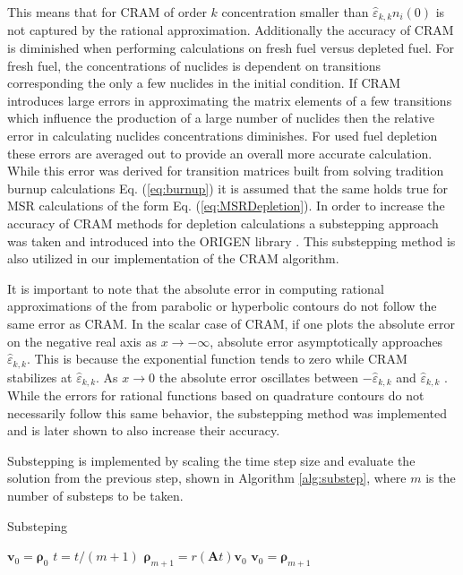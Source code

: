 \noindent This means that for CRAM of order $k$ concentration smaller than $\hat{\varepsilon}_{k,k}n_{i}(0)$ is not captured by the rational approximation. Additionally the accuracy of CRAM is diminished when performing calculations on fresh fuel versus depleted fuel. For fresh fuel, the concentrations of nuclides is dependent on transitions corresponding the only a few nuclides in the initial condition. If CRAM introduces large errors in approximating the matrix elements of a few transitions which influence the production of a large number of nuclides then the relative error in calculating nuclides concentrations diminishes. For used fuel depletion these errors are averaged out to provide an overall more accurate calculation. While this error was derived for transition matrices built from solving tradition burnup calculations Eq. (\ref{eq:burnup}) it is assumed that the same holds true for MSR calculations of the form Eq. (\ref{eq:MSRDepletion}). In order to increase the accuracy of CRAM methods for depletion calculations a substepping approach was taken and introduced into the ORIGEN library \cite{isotalo2016}. This substepping method is also utilized in our implementation of the CRAM algorithm. 

It is important to note that the absolute error in computing rational approximations of the from parabolic or hyperbolic contours do not follow the same error as CRAM. In the scalar case of CRAM, if one plots the absolute error on the negative real axis as $x \rightarrow -\infty$, absolute error asymptotically approaches $\hat{\varepsilon}_{k,k}$. This is because the exponential function tends to zero while CRAM stabilizes at $\hat{\varepsilon}_{k,k}$. As $x \rightarrow 0$ the absolute error oscillates between $-\hat{\varepsilon}_{k,k}$ and $\hat{\varepsilon}_{k,k}$ \cite{pusaAccruacy2013}. While the errors for rational functions based on quadrature contours do not necessarily follow this same behavior, the substepping method was implemented and is later shown to also increase their accuracy. 

Substepping is implemented by scaling the time step size and evaluate the solution from the previous step, shown in Algorithm \ref{alg:substep}, where $m$ is the number of substeps to be taken. 

\begin{algorithm}
	\caption{Substeping} 
	\begin{algorithmic}[1]
	    \State $\boldsymbol{v}_{0} = \boldsymbol{\rho}_{0}$
	    \State $t = t/(m+1)$
            \State $\boldsymbol{\rho}_{m+1} = r(\boldsymbol{A}t)\boldsymbol{v}_{0}$
            \State $\boldsymbol{v}_{0} = \boldsymbol{\rho}_{m+1}$
		\EndFor
	\end{algorithmic} 
	\label{alg:substep}
\end{algorithm}


